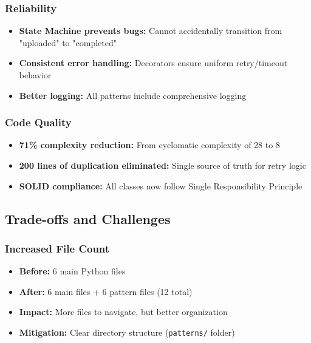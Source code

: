 \documentclass[11pt,a4paper]{article}
\begin{document}
\subsubsection{Reliability}

\begin{itemize}
    \item \textbf{State Machine prevents bugs:} Cannot accidentally transition from "uploaded" to "completed"
    \item \textbf{Consistent error handling:} Decorators ensure uniform retry/timeout behavior
    \item \textbf{Better logging:} All patterns include comprehensive logging
\end{itemize}

\subsubsection{Code Quality}

\begin{itemize}
    \item \textbf{71\% complexity reduction:} From cyclomatic complexity of 28 to 8
    \item \textbf{200 lines of duplication eliminated:} Single source of truth for retry logic
    \item \textbf{SOLID compliance:} All classes now follow Single Responsibility Principle
\end{itemize}

\subsection{Trade-offs and Challenges}

\subsubsection{Increased File Count}

\begin{itemize}
    \item \textbf{Before:} 6 main Python files
    \item \textbf{After:} 6 main files + 6 pattern files (12 total)
    \item \textbf{Impact:} More files to navigate, but better organization
    \item \textbf{Mitigation:} Clear directory structure (\texttt{patterns/} folder)
\end{itemize}
\end{document}
